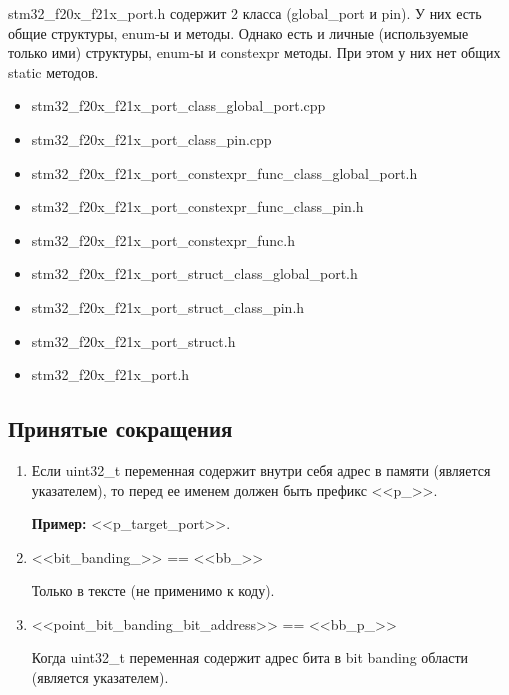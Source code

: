 \begin{enumerate}
	stm32\_f20x\_f21x\_port.h содержит 2 класса (global\_port и pin). У них есть общие структуры, enum-ы и методы. Однако есть и личные (используемые только ими) структуры, enum-ы и constexpr методы. При этом у них нет общих static методов.
	\begin{itemize}
		\item stm32\_f20x\_f21x\_port\_class\_global\_port.cpp
		\item stm32\_f20x\_f21x\_port\_class\_pin.cpp 
		\item stm32\_f20x\_f21x\_port\_constexpr\_func\_class\_global\_port.h
		\item stm32\_f20x\_f21x\_port\_constexpr\_func\_class\_pin.h
		\item stm32\_f20x\_f21x\_port\_constexpr\_func.h
		\item stm32\_f20x\_f21x\_port\_struct\_class\_global\_port.h
		\item stm32\_f20x\_f21x\_port\_struct\_class\_pin.h
		\item stm32\_f20x\_f21x\_port\_struct.h
		\item stm32\_f20x\_f21x\_port.h
	\end{itemize}
\end{enumerate}

\subsection{Принятые сокращения}
\label{sk:0}
\begin{enumerate}
	\item Если uint32\_t переменная содержит внутри себя адрес в памяти (является указателем), то перед ее именем должен быть префикс <<p\_>>.
	
	\textbf{Пример:} <<p\_target\_port>>.
	\item <<bit\_banding\_>> == <<bb\_>>
	
	Только в тексте (не применимо к коду).
	\item <<point\_bit\_banding\_bit\_address>> == <<bb\_p\_>>
	
	Когда uint32\_t переменная содержит адрес бита в bit banding области (является указателем).
	
\end{enumerate}

